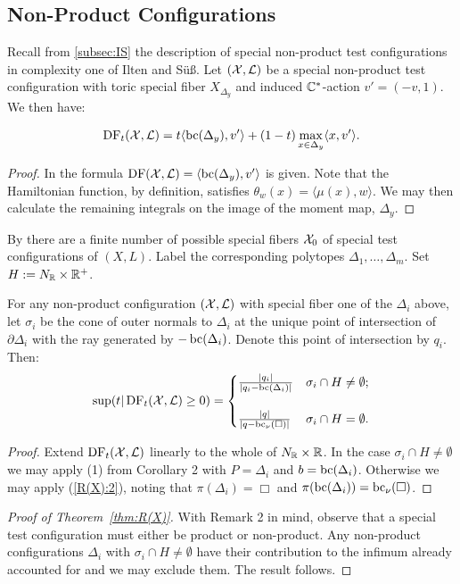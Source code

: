 \subsection{Non-Product Configurations}
Recall from \ref{subsec:IS} the description of special non-product test configurations in complexity one of Ilten and S{\"u}{\ss}. Let \(({\mathcal{X}},\mathcal{L})\) be a special non-product test configuration with toric special fiber \(X_{\Delta_y}\) and induced \(\mathbb{C}^*\)-action \(v' = (-v,1) \). We then have:
\begin{proposition}
\[
\mathop{\rm DF}\nolimits_t( {\mathcal{X}}, \mathcal{L} )  = t \langle \mathop{\rm bc}\nolimits(\Delta_y), v' \rangle + (1-t) \max_{x \in \Delta_y} \langle x, v' \rangle.
\]
\end{proposition}
\begin{proof}
In \cite{ilten2015} the formula \(\mathop{\rm DF}\nolimits({\mathcal{X}},\mathcal{L}) = \langle \mathop{\rm bc}\nolimits(\Delta_y),v'\rangle\) is given. Note that the Hamiltonian function, by definition, satisfies \(\theta_w(x) = \langle \mu(x),w \rangle\). We may then calculate the remaining integrals on the image of the moment map, \(\Delta_y\).
\end{proof}
By \cite{ilten2015} there are a finite number of possible special fibers \({\mathcal{X}}_0\) of special test configurations of \((X,L)\). Label the corresponding polytopes \(\Delta_1,\dots,\Delta_m\). Set \(H := N_{\mathbb{R}} \times \mathbb{R}^+\).
\begin{proposition}
For any non-product configuration \(({\mathcal{X}},\mathcal{L})\) with special fiber one of the \(\Delta_i\) above, let \(\sigma_i\) be the cone of outer normals to \(\Delta_i\) at the unique point of intersection of \(\partial \Delta_i\) with the ray generated by \(-\mathop{\rm bc}\nolimits(\Delta_i)\). Denote this point of intersection by \(q_i\). Then:
\[
\sup(t | \mathop{\rm DF}\nolimits_t({\mathcal{X}},\mathcal{L}) \ge 0) =\begin{cases} 
     \frac{|q_i|}{|q_i - \mathop{\rm bc}\nolimits(\Delta_i)|} & \sigma_i \cap H \neq \emptyset ;\\ \\
      \frac{|q|}{|q-\mathop{\rm bc}\nolimits_\nu(\Box)|} & \sigma_i \cap H = \emptyset.
   \end{cases}
\]
\end{proposition}
\begin{proof}
Extend \(\mathop{\rm DF}\nolimits_t({\mathcal{X}},\mathcal{L})\) linearly to the whole of \(N_{\mathbb{R}} \times \mathbb{R}\). In the case \(\sigma_i \cap H \neq \emptyset\) we may apply (1) from Corollary 2 with \(P = \Delta_i\) and \(b = \mathop{\rm bc}\nolimits(\Delta_i)\). Otherwise we may apply (\ref{R(X):2}), noting that \(\pi(\Delta_i) = \Box\) and \(\pi(\mathop{\rm bc}\nolimits(\Delta_i)) = \mathop{\rm bc}\nolimits_\nu( \Box)\).
\end{proof}
\begin{proof}[Proof of Theorem~\ref{thm:R(X)}]
With Remark 2 in mind, observe that a special test configuration must either be product or non-product. Any non-product configurations \(\Delta_i\) with \(\sigma_i \cap H \neq \emptyset\) have their contribution to the infimum already accounted for and we may exclude them. The result follows.
\end{proof}
